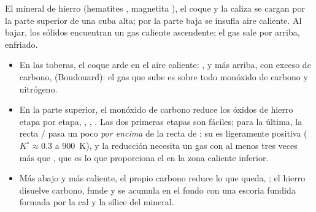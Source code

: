 El mineral de hierro (hematites , magnetita ), el coque y la caliza se
cargan por la parte superior de una cuba alta; por la parte baja se insufla aire
caliente. Al bajar, los sólidos encuentran un gas caliente ascendente; el gas sale
por arriba, enfriado.
\begin{itemize}
  \item En las toberas, el coque arde en el aire caliente: , y
        más arriba, con exceso de carbono,  (Boudouard): el gas
        que sube es sobre todo monóxido de carbono y nitrógeno.
  \item En la parte superior, el monóxido de carbono reduce los óxidos de hierro etapa por
        etapa, , ,
        . Las dos primeras etapas son fáciles; para la última,
        la recta / pasa un poco \textit{por encima} de la recta de
        : su  es ligeramente positiva
        ($K^\circ \approx 0.3$ a \qty{900}{K}), y la reducción necesita un gas
        con al menos tres veces más  que , que es lo que
        proporciona el  en la zona caliente inferior.
  \item Más abajo y más caliente, el propio carbono reduce lo que queda, ; el hierro disuelve carbono, funde y se acumula en el fondo
        con una escoria fundida formada por la cal y la sílice del mineral.
\end{itemize}

